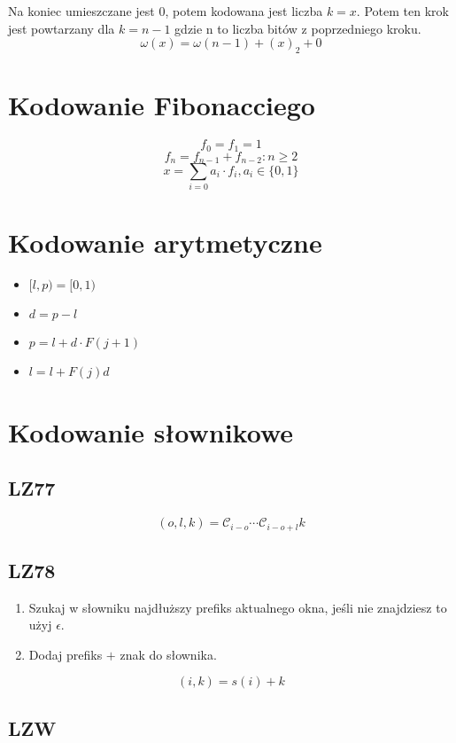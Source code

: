 \documentclass{../notatki}
\begin{document}
\begin{multicols}{2}
  Na koniec umieszczane jest $0$, potem kodowana jest liczba $k=x$. Potem ten
  krok jest powtarzany dla $k=n - 1$ gdzie n to liczba bitów z
  poprzedniego kroku.
  $$
  \omega(x) = \omega(n - 1) + (x)_2 + 0
  $$

  \section{Kodowanie Fibonacciego}

  $$
  f_0=f_1=1
  $$
  $$
  f_n = f_{n-1} + f_{n-2}: n \geq 2
  $$
  $$
  x = \sum_{i=0} a_i \cdot f_i, a_i \in \{0,1\}
  $$

  \section{Kodowanie arytmetyczne}

  \begin{itemize}
    \item $[l, p)=[0, 1)$
    \item $d = p - l$
    \item $p = l + d \cdot F(j + 1)$
    \item $l = l + F(j)d$
  \end{itemize}

  \section{Kodowanie słownikowe}

  \subsection{LZ77}

  $$
  (o, l, k) = \mathcal{C}_{i - o} \cdots \mathcal{C}_{i - o + l} k
  $$

  \subsection{LZ78}

  \begin{enumerate}
    \item Szukaj w słowniku najdłuższy prefiks aktualnego okna, jeśli
      nie znajdziesz to użyj $\epsilon$.
    \item Dodaj prefiks $+$ znak do słownika.
  \end{enumerate}

  $$
  (i, k) = s(i) + k
  $$

  \subsection{LZW}


\end{multicols}
\end{document}
